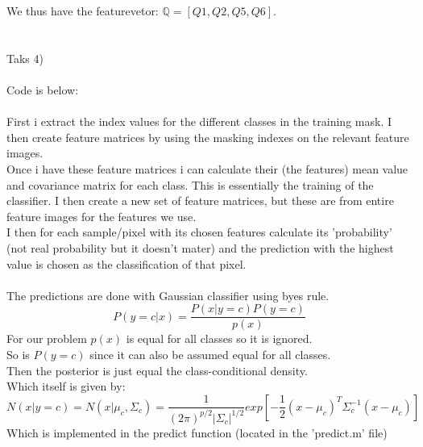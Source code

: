 \documentclass[12pt, letterpaper, twoside]{article}
\begin{document}
We thus have the featurevetor: $\mathbb{Q} = [Q1, Q2, Q5, Q6]$.\\ 
\ \\
\ \\
Taks 4)\\
\ \\
Code is below:\\
\ \\
First i extract the index values for the different classes in the training mask.  I then create feature matrices by using the masking indexes on the relevant feature images.\\
Once i have these feature matrices i can calculate their (the features) mean value and covariance matrix for each class. This is essentially the training of the classifier. I then create a new set of feature matrices, but these are from entire feature images for the features we use.\\
I then for each sample/pixel with its chosen features calculate its 'probability' (not real probability but it doesn't mater) and the prediction with the highest value is chosen as the classification of that pixel.\\
\ \\
The predictions are done with Gaussian classifier using byes rule.\\
$$
P(y=c|x) = \frac{P(x|y=c)P(y=c)}{p(x)}
$$  
For our problem $p(x)$ is equal for all classes so it is ignored.\\
So is $P(y=c)$ since it can also be assumed equal for all classes.\\
Then the posterior is just equal the class-conditional density.\\
Which itself is given by:\\
$$
N(x|y=c) = N(x|\mu_c,\Sigma_c) =
\frac{1}{(2\pi)^{p/2} |\Sigma_c|^{1/2}}exp[-\frac{1}{2} (x - \mu_c)^T \Sigma_c^{-1} (x - \mu_c)]
$$ 
Which is implemented in the predict function (located in the 'predict.m' file)\\
\newpage
\ \\
\end{document}
